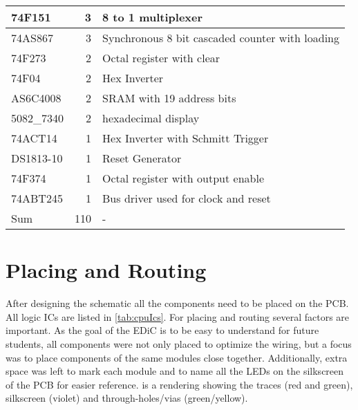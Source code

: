 \begin{table}[t]
\begin{tabularx}{\textwidth}{ |l|r||X| }
    74F151     & 3        & 8 to 1 multiplexer                                                 \\\hline
    74AS867    & 3        & Synchronous 8 bit cascaded counter with loading                    \\\hline
    74F273     & 2        & Octal register with clear                                          \\\hline
    74F04      & 2        & Hex Inverter                                                       \\\hline
    AS6C4008   & 2        & \gls{SRAM} with 19 address bits                                    \\\hline
    5082\_7340 & 2        & hexadecimal display                                                \\\hline
    74ACT14    & 1        & Hex Inverter with Schmitt Trigger                                  \\\hline
    DS1813-10  & 1        & Reset Generator                                                    \\\hline
    74F374     & 1        & Octal register with output enable                                  \\\hline
    74ABT245   & 1        & Bus driver used for clock and reset                                \\\hline\hline
    Sum        & 110      & -                                                                  \\\hline
  \end{tabularx}
\end{table}

\section{Placing and Routing}\label{sec:pr}
After designing the schematic all the components need to be placed on the \gls{PCB}.
All logic \glspl{IC} are listed in \cref{tab:cpuIcs}.
For placing and routing several factors are important.
As the goal of the \gls{EDiC} is to be easy to understand for future students, all components were not only placed to optimize the wiring, but a focus was to place components of the same modules close together.
Additionally, extra space was left to mark each module and to name all the \glspl{LED} on the silkscreen of the \gls{PCB} for easier reference.
 is a rendering showing the traces (red and green), silkscreen (violet) and through-holes/vias (green/yellow).

